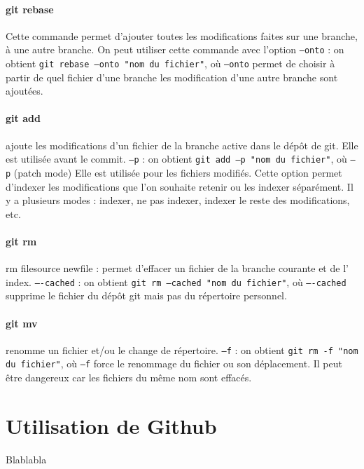 \documentclass[11pt,canadien]{article}
\begin{document}
\paragraph{git rebase}Cette commande permet d'ajouter toutes les modifications faites sur une branche, à une autre branche. On peut utiliser cette commande avec l'option \texttt{–onto} : on obtient \texttt{git rebase –onto "nom du fichier"}, où \texttt{–onto} permet de choisir à partir de quel fichier d'une branche les modification d'une autre branche sont ajoutées.

\paragraph{git add} ajoute les modifications d’un fichier de la branche active dans le dépôt de git. Elle est utilisée avant le commit. \texttt{–p} : on obtient \texttt{git add –p "nom du fichier"}, où \texttt{–p} (patch mode) Elle est utilisée pour les fichiers modifiés. Cette option permet d’indexer les modifications que l’on souhaite retenir ou les indexer séparément. Il y a plusieurs modes : indexer, ne pas indexer, indexer le reste des modifications, etc.

\paragraph{git rm} rm filesource  newfile : permet d’effacer un fichier de la branche courante et de l’ index. \texttt{–-cached} : on obtient \texttt{git rm --cached "nom du fichier"}, où \texttt{–-cached} supprime le fichier du dépôt git mais pas du répertoire personnel.

\paragraph{git mv} renomme un fichier et/ou le change de répertoire. \texttt{–f} : on obtient \texttt{git rm -f "nom du fichier"}, où \texttt{–f} force le renommage du fichier ou son déplacement. Il peut être dangereux car les fichiers du même nom sont effacés. 

\section{Utilisation de Github}
Blablabla
\end{document}
